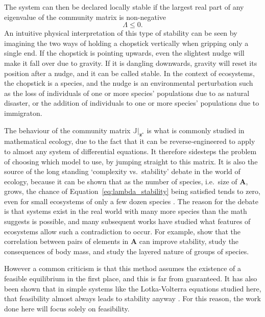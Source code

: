 The system can then be declared locally stable if the largest real part of any eigenvalue of the community matrix is non-negative
\begin{equation}
    \Lambda \leq 0.
    \label{eq:lambda_stability}
\end{equation}
An intuitive physical interpretation of this type of stability can be seen by imagining the two ways of holding a chopstick vertically when gripping only a single end. If the chopstick is pointing upwards, even the slightest nudge will make it fall over due to gravity. If it is dangling downwards, gravity will reset its position after a nudge, and it can be called stable.
In the context of ecosystems, the chopstick is a species, and the nudge is an environmental perturbation such as the loss of individuals of one or more species' populations due to as natural disaster, or the addition of individuals to one or more species' populations due to immigraton.

The behaviour of the community matrix $\mathbb{J}|_\mathbf{z^*}$ is what is commonly studied in mathematical ecology, due to the fact that it can be reverse-engineered to apply to almost any system of differential equations. It therefore sidesteps the problem of choosing which model to use, by jumping straight to this matrix.
It is also the source of the long standing `complexity vs.\ stability' debate in the world of ecology, because it can be shown that as the number of species, i.e.\ size of $\mathbf{A}$, grows, the chance of Equation~\eqref{eq:lambda_stability} being satisfied tends to zero, even for small ecosystems of only a few dozen species \citep{May1973}.
The reason for the debate is that systems exist in the real world with many more species than the math suggests is possible, and many subsequent works have studied what features of ecosystems allow such a contradiction to occur.
For example, \citet{Tang2014Correlation} show that the correlation between pairs of elements in $\mathbf{A}$ can improve stability, \citet{Brose2006} study the consequences of body mass, and \citet{Johnson2014} study the layered nature of groups of species.

However a common criticism is that this method assumes the existence of a feasible equilibrium in the first place, and this is far from guaranteed. It has also been shown that in simple systems like the Lotka-Volterra equations studied here, that feasibility almost always leads to stability anyway \citep{Dougoud2018}. For this reason, the work done here will focus solely on feasibility.


